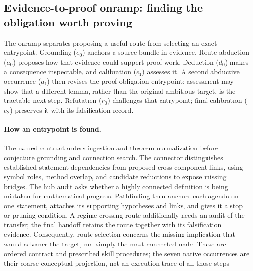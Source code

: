 

\subsection{Evidence-to-proof onramp: finding the obligation worth proving}
\label{app:granular-evidence-to-proof-route-onramp}
The onramp separates proposing a useful route from selecting an exact entrypoint.
Grounding ($e_0$) anchors a source bundle in evidence. Route abduction ($a_0$)
proposes how that evidence could support proof work. Deduction ($d_0$) makes a
consequence inspectable, and calibration ($e_1$) assesses it. A second abductive
occurrence ($a_1$) then revises the proof-obligation entrypoint: assessment may
show that a different lemma, rather than the original ambitious target, is the
tractable next step. Refutation ($r_0$) challenges that entrypoint; final
calibration ($e_2$) preserves it with its falsification record.

\paragraph{How an entrypoint is found.}
The named contract orders ingestion and theorem normalization before conjecture
grounding and connection search. The connector distinguishes established
statement dependencies from proposed cross-component links, using symbol roles,
method overlap, and candidate reductions to expose missing bridges. The hub audit
asks whether a highly connected definition is being mistaken for mathematical
progress. Pathfinding then anchors each agenda on one statement, attaches its
supporting hypotheses and links, and gives it a stop or pruning condition. A
regime-crossing route additionally needs an audit of the transfer; the final
handoff retains the route together with its falsification evidence. Consequently,
route selection concerns the missing implication that would advance the target,
not simply the most connected node. These are ordered contract and prescribed
skill procedures; the seven native occurrences are their coarse conceptual
projection, not an execution trace of all those steps.

